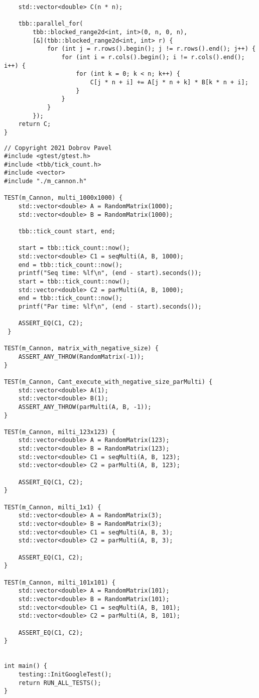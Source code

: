 \documentclass{report}
\begin{document}
\begin{lstlisting}
    std::vector<double> C(n * n);

    tbb::parallel_for(
        tbb::blocked_range2d<int, int>(0, n, 0, n),
        [&](tbb::blocked_range2d<int, int> r) {
            for (int j = r.rows().begin(); j != r.rows().end(); j++) {
                for (int i = r.cols().begin(); i != r.cols().end(); i++) {
                    for (int k = 0; k < n; k++) {
                        C[j * n + i] += A[j * n + k] * B[k * n + i];
                    }
                }
            }
        });
    return C;
}
\end{lstlisting}
\begin{lstlisting}
// Copyright 2021 Dobrov Pavel
#include <gtest/gtest.h>
#include <tbb/tick_count.h>
#include <vector>
#include "./m_cannon.h"

TEST(m_Cannon, multi_1000x1000) {
    std::vector<double> A = RandomMatrix(1000);
    std::vector<double> B = RandomMatrix(1000);

    tbb::tick_count start, end;

    start = tbb::tick_count::now();
    std::vector<double> C1 = seqMulti(A, B, 1000);
    end = tbb::tick_count::now();
    printf("Seq time: %lf\n", (end - start).seconds());
    start = tbb::tick_count::now();
    std::vector<double> C2 = parMulti(A, B, 1000);
    end = tbb::tick_count::now();
    printf("Par time: %lf\n", (end - start).seconds());

    ASSERT_EQ(C1, C2);
 }

TEST(m_Cannon, matrix_with_negative_size) {
    ASSERT_ANY_THROW(RandomMatrix(-1));
}

TEST(m_Cannon, Cant_execute_with_negative_size_parMulti) {
    std::vector<double> A(1);
    std::vector<double> B(1);
    ASSERT_ANY_THROW(parMulti(A, B, -1));
}

TEST(m_Cannon, milti_123x123) {
    std::vector<double> A = RandomMatrix(123);
    std::vector<double> B = RandomMatrix(123);
    std::vector<double> C1 = seqMulti(A, B, 123);
    std::vector<double> C2 = parMulti(A, B, 123);

    ASSERT_EQ(C1, C2);
}

TEST(m_Cannon, milti_1x1) {
    std::vector<double> A = RandomMatrix(3);
    std::vector<double> B = RandomMatrix(3);
    std::vector<double> C1 = seqMulti(A, B, 3);
    std::vector<double> C2 = parMulti(A, B, 3);

    ASSERT_EQ(C1, C2);
}

TEST(m_Cannon, milti_101x101) {
    std::vector<double> A = RandomMatrix(101);
    std::vector<double> B = RandomMatrix(101);
    std::vector<double> C1 = seqMulti(A, B, 101);
    std::vector<double> C2 = parMulti(A, B, 101);

    ASSERT_EQ(C1, C2);
}


int main() {
    testing::InitGoogleTest();
    return RUN_ALL_TESTS();
}
\end{lstlisting}
\end{document}
